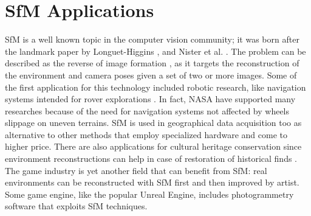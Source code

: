 \section{SfM Applications}
SfM is a well known topic in the computer vision community; it was born after 
the landmark paper by Longuet-Higgins \cite{longuet1981computer}, and
Nister et al. \cite{moravec1980obstacle}.
The problem can be described as the reverse of image formation
\cite{Wei2013}, as it targets the reconstruction of the environment 
and camera poses given a set of two or more images.
Some of the first application for this technology included robotic research, 
like navigation systems intended for rover explorations 
\cite{moravec1980obstacle,durrant1996localization}. In fact, NASA have supported
many researches because of the need for navigation systems not affected by wheels
slippage on uneven terrains.
SfM is used in geographical data acquisition too
\cite{fonstad2013topographic,westoby2012structure,james2012straightforward}
as alternative to other methods that employ specialized hardware and 
come to higher price.
There are also applications for cultural heritage conservation since 
environment reconstructions can help in case of restoration of historical finds
\cite{kraus2007photogrammetry}.
The game industry is yet another field that can benefit from 
SfM: real environments can be reconstructed with SfM first and then 
improved by artist. Some game engine, like the popular Unreal Engine\registered,
includes photogrammetry software that exploits SfM techniques. 

